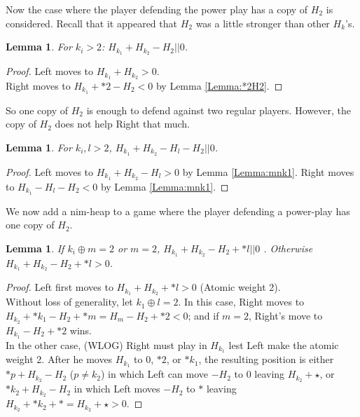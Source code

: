 \documentclass{amsart}
\newtheorem{lemma}[definition]{Lemma}
\begin{document}
Now the case where the player defending the power play has a copy of $H_2$ is considered.  Recall that it appeared that $H_2$ was a little stronger than other $H_k$'s.

\begin{lemma}
\label{Lemma:mn2}
For $k_i>2$: $H_{k_1}+H_{k_2}-H_2||0$.
\end{lemma}
\begin{proof}
Left moves to $H_{k_1}+H_{k_2}>0$.\\
Right moves to $H_{k_1}+*2-H_2<0$ by Lemma \ref{Lemma:*2H2}.
\end{proof}

So one copy of $H_2$ is enough to defend against two regular players.  However, the copy of $H_2$ does not help Right that much.

\begin{lemma}

\label{Lemma:mnk2}
For $k_i,l>2$, $H_{k_1}+H_{k_2}-H_l-H_2||0$.
\end{lemma}
\begin{proof}
Left moves to $H_{k_1}+H_{k_2}-H_l>0$ by Lemma \ref{Lemma:mnk1}. Right moves to $H_{k_1}-H_l-H_2<0$ by Lemma \ref{Lemma:mnk1}.
\end{proof}

We now add a nim-heap to a game where the player defending a power-play has one copy of $H_2$.



\begin{lemma}
\label{Lemma:oplus}
If $k_i\oplus m=2$ or $m=2$, $H_{k_1}+H_{k_2}-H_2+*l||0$ .  Otherwise $H_{k_1}+H_{k_2}-H_2+*l>0$.\\
\end{lemma}
\begin{proof}
Left first moves to $H_{k_1}+H_{k_2}+*l>0$ (Atomic weight 2).\\
Without loss of generality, let $k_1\oplus l=2$.  In this case, Right moves to $H_{k_2}+*k_1-H_2+*m=H_m-H_2+*2<0$; and if $m=2$, Right's move to $H_{k_1}-H_2+*2$ wins.\\
 In the other case, (WLOG) Right must play in $H_{k_1}$ lest Left make the atomic weight 2.  After he moves $H_{k_1}$ to 0, $*2$, or $*k_1$, the resulting position is either $*p+ H_{k_2}-H_2$ ($p\neq k_2$) in which Left can move $-H_2$ to 0 leaving $H_{k_2}+\star$, or $*k_2+H_{k_2}-H_2$ in which Left moves $-H_2$ to $*$ leaving $H_{k_2}+*k_2+*=H_{k_2}+\star>0$.
\end{proof}
\end{document}
